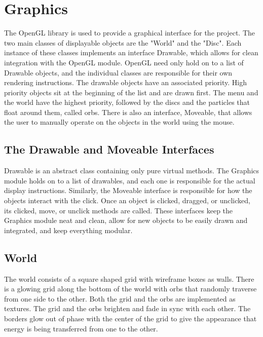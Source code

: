 \documentclass[pdftext,twoside,10pt]{article}
\begin{document}
\vspace{1cm}

\section{Graphics}
The OpenGL library is used to provide a graphical interface for the project. The two main classes of displayable objects are the "World" and the "Disc". Each instance of these classes implements an interface Drawable, which allows for clean integration with the OpenGL module. OpenGL need only hold on to a list of Drawable objects, and the individual classes are responsible for their own rendering instructions. The drawable objects have an associated priority. High priority objects sit at the beginning of the list and are drawn first. The menu and the world have the highest priority, followed by the discs and the particles that float around them, called orbs. There is also an interface, Moveable, that allows the user to manually operate on the objects in the world using the mouse.

\subsection{The Drawable and Moveable Interfaces}
Drawable is an abstract class containing only pure virtual methods. The Graphics module holds on to a list of drawables, and each one is responsible for the actual display instructions. Similarly, the Moveable interface is responsible for how the objects interact with the click. Once an object is clicked, dragged, or unclicked, its clicked, move, or unclick methods are called. These interfaces keep the Graphics module neat and clean, allow for new objects to be easily drawn and integrated, and keep everything modular.

\subsection{World}
The world consists of a square shaped grid with wireframe boxes as walls. There is a glowing grid along the bottom of the world with orbs that randomly traverse from one side to the other. Both the grid and the orbs are implemented as textures. The grid and the orbs brighten and fade in sync with each other. The borders glow out of phase with the center of the grid to give the appearance that energy is being transferred from one to the other.
\end{document}
